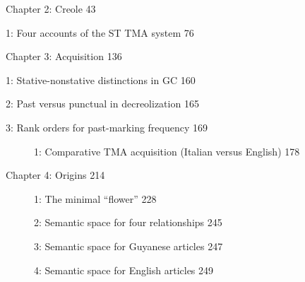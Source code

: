 Chapter 2: Creole 43

\begin{table}
\caption{1: Four accounts of the ST TMA system 76}
\label{tab:2}
\end{table}

Chapter 3: Acquisition 136

\begin{table}
\caption{1: Stative-nonstative distinctions in GC 160}
\label{tab:3}
\end{table}

\begin{table}
\caption{2: Past versus punctual in decreolization 165}
\label{tab:3}
\end{table}

\begin{table}
\caption{3: Rank orders for past-marking frequency 169}
\label{tab:3}
\end{table}

\begin{figure}
\caption{1: Comparative TMA acquisition (Italian versus English) 178}
\label{fig:3}
\end{figure}

Chapter 4: Origins 214

\begin{figure}
\caption{1: The minimal ``flower'' 228}
\label{fig:4}
\end{figure}

\begin{figure}
\caption{2: Semantic space for four relationships 245}
\label{fig:4}
\end{figure}

\begin{figure}
\caption{3: Semantic space for Guyanese articles 247}
\label{fig:4}
\end{figure}

\begin{figure}
\caption{4: Semantic space for English articles 249}
\label{fig:4}
\end{figure}

